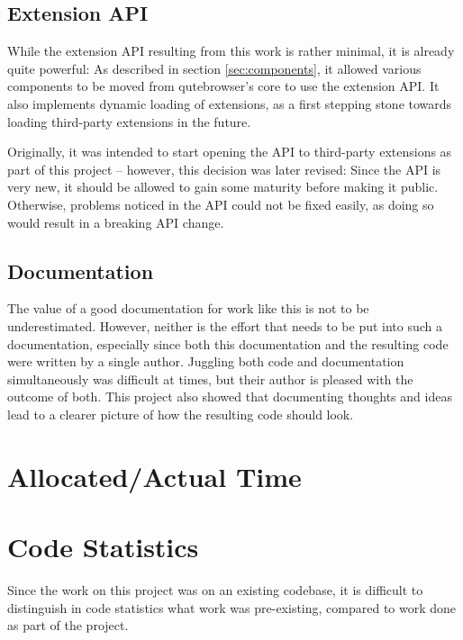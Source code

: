 \subsection{Extension API}

While the extension API resulting from this work is rather minimal, it is
already quite powerful: As described in section \ref{sec:components}, it allowed
various components to be moved from qutebrowser's core to use the extension API.
It also implements dynamic loading of extensions, as a first stepping stone
towards loading third-party extensions in the future.

Originally, it was intended to start opening the API to third-party extensions
as part of this project -- however, this decision was later revised: Since the
API is very new, it should be allowed to gain some maturity before making it
public. Otherwise, problems noticed in the API could not be fixed easily, as
doing so would result in a breaking API change.

\subsection{Documentation}

The value of a good documentation for work like this is not to be
underestimated. However, neither is the effort that needs to be put into such a
documentation, especially since both this documentation and the resulting code
were written by a single author. Juggling both code and documentation
simultaneously was difficult at times, but their author is pleased with the
outcome of both. This project also showed that documenting thoughts and ideas
lead to a clearer picture of how the resulting code should look.

\section{Allocated/Actual Time}
\fixme{}

\section{Code Statistics}
Since the work on this project was on an existing codebase, it is difficult to
distinguish in code statistics what work was pre-existing, compared to work done
as part of the project.

